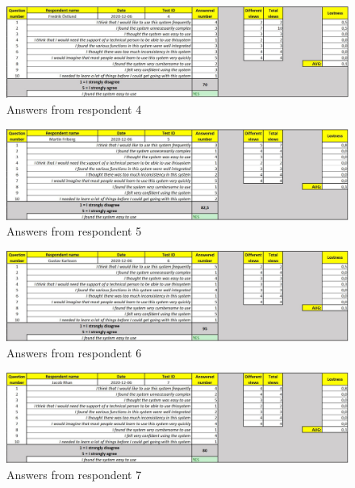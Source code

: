 \documentclass[12pt]{article}
\begin{document}
    \begin{figure}[H]
        \centering
        \includegraphics[width=\linewidth]{Pictures/Usertest_4.JPG}
        \caption{Answers from respondent 4}
        \label{fig:Usertest_4}
    \end{figure}
    \begin{figure}[H]
        \centering
        \includegraphics[width=\linewidth]{Pictures/Usertest_5.JPG}
        \caption{Answers from respondent 5}
        \label{fig:Usertest_5}
    \end{figure}
    \begin{figure}[H]
        \centering
        \includegraphics[width=\linewidth]{Pictures/Usertest_6.JPG}
        \caption{Answers from respondent 6}
        \label{fig:Usertest_6}
    \end{figure}
    \begin{figure}[H]
        \centering
        \includegraphics[width=\linewidth]{Pictures/Usertest_7.JPG}
        \caption{Answers from respondent 7}
        \label{fig:Usertest_7}
    \end{figure}
\end{document}
